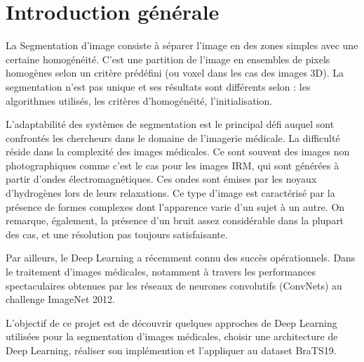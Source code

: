 \chapter*{Introduction générale}
\lhead{}

La Segmentation d’image consiste à séparer l’image en des zones simples avec une certaine homogénéité.  C’est une partition de l'image en ensembles de pixels homogènes selon un critère prédéfini (ou voxel dans les cas des images 3D). La segmentation n'est pas unique et ses résultats sont différents selon : les algorithmes utilisés, les critères d'homogénéité, l’initialisation.\newline


L'adaptabilité des systèmes de segmentation est le principal défi auquel sont confrontés les chercheurs dans le domaine de l'imagerie médicale.  La difficulté réside dans la complexité des images médicales. Ce sont souvent des images non photographiques comme c'est le cas pour les images IRM, qui sont générées à partir d'ondes électromagnétiques. Ces ondes sont émises par les noyaux d'hydrogènes lors de leurs relaxations. Ce type d'image est caractérisé par la présence de formes complexes dont l'apparence varie d'un sujet à un autre. On remarque, également, la présence d’un bruit assez considérable dans la plupart des cas, et une résolution pas toujours satisfaisante.\newline

Par ailleurs, le Deep Learning a récemment connu des succès opérationnels. Dans le traitement d’images médicales, notamment à travers les performances spectaculaires obtenues par les réseaux de neurones convolutifs (ConvNets) au challenge ImageNet 2012.


\newpage
 L’objectif de ce projet est de découvrir quelques approches de Deep Learning utilisées pour la segmentation d’images médicales, choisir une architecture de Deep Learning, réaliser son implémention et l'appliquer au dataset BraTS19.\newline

